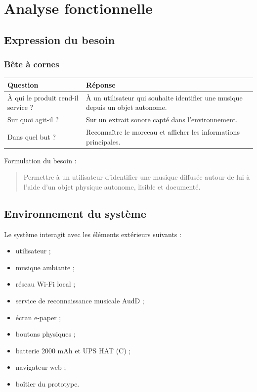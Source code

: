 \section{Analyse fonctionnelle}

\subsection{Expression du besoin}

\subsubsection{Bête à cornes}

\begin{longtable}{|p{5cm}|p{8cm}|}
\hline
\textbf{Question} & \textbf{Réponse} \\
\hline
À qui le produit rend-il service ? &
À un utilisateur qui souhaite identifier une musique depuis un objet autonome. \\
\hline
Sur quoi agit-il ? &
Sur un extrait sonore capté dans l'environnement. \\
\hline
Dans quel but ? &
Reconnaître le morceau et afficher les informations principales. \\
\hline
\end{longtable}

Formulation du besoin :

\begin{quote}
Permettre à un utilisateur d'identifier une musique diffusée autour de lui à
l'aide d'un objet physique autonome, lisible et documenté.
\end{quote}

\subsection{Environnement du système}

Le système interagit avec les éléments extérieurs suivants :

\begin{itemize}
    \item utilisateur ;
    \item musique ambiante ;
    \item réseau Wi-Fi local ;
    \item service de reconnaissance musicale AudD ;
    \item écran e-paper ;
    \item boutons physiques ;
    \item batterie 2000 mAh et UPS HAT (C) ;
    \item navigateur web ;
    \item boîtier du prototype.
\end{itemize}

